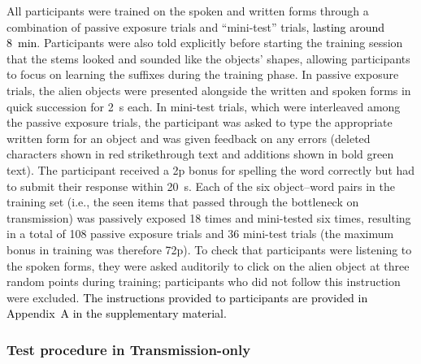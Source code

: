 \documentclass[doc,biblatex]{apa7}
\newcommand\newmaterial[1]{\textcolor{black}{#1}}
\begin{document}
All participants were trained on the spoken and written forms through a combination of passive exposure trials and ``mini-test'' trials\newmaterial{, lasting around 8~min}. Participants were also told explicitly before starting the training session that the stems looked and sounded like the objects' shapes, allowing participants to focus on learning the suffixes during the training phase. In passive exposure trials, the alien objects were presented alongside the written and spoken forms in quick succession for 2~s each. In mini-test trials, which were interleaved among the passive exposure trials, the participant was asked to type the appropriate written form for an object and was given feedback on any errors (deleted characters shown in red strikethrough text and additions shown in bold green text). The participant received a 2p bonus for spelling the word correctly but had to submit their response within 20~s. Each of the six object--word pairs in the training set (i.e., the seen items that passed through the bottleneck on transmission) was passively exposed 18 times and mini-tested six times, resulting in a total of 108 passive exposure trials and 36 mini-test trials (the maximum bonus in training was therefore 72p). To check that participants were listening to the spoken forms, they were asked auditorily to click on the alien object at three random points during training; participants who did not follow this instruction were excluded. \newmaterial{The instructions provided to participants are provided in Appendix~A in the supplementary material.}

\subsubsection{Test procedure in Transmission-only}
\end{document}
